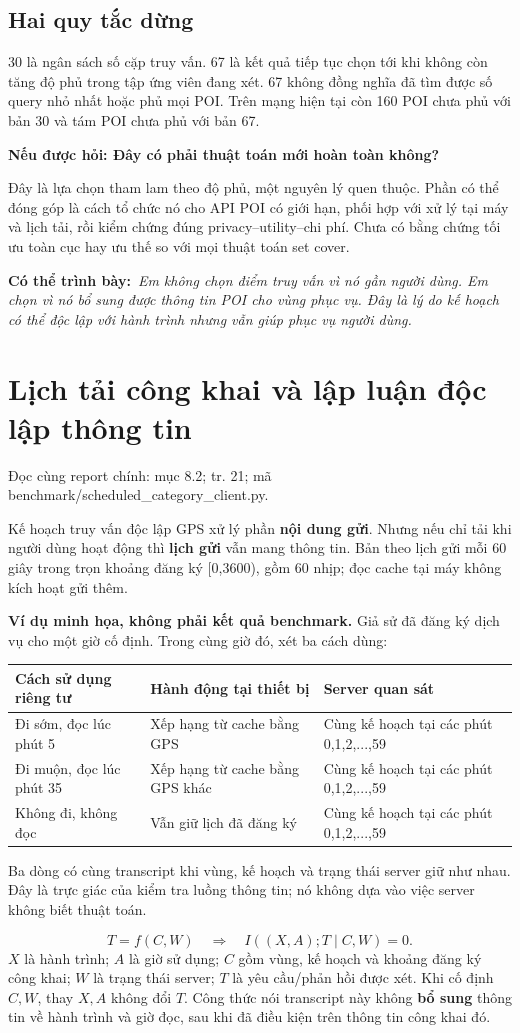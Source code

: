 \documentclass[10pt,a4paper]{article}
\newcommand{\say}[1]{\par\textbf{Có thể trình bày:}\ \textit{#1}\par}
\newcommand{\ask}[2]{\par\textbf{Nếu được hỏi: #1}\par #2\par}
\newcommand{\where}[1]{\par{\small\color{gray}Đọc cùng report chính: #1.}\par}
\newcommand{\example}{\textbf{Ví dụ minh họa, không phải kết quả benchmark.} }
\newcommand{\guidepage}[1]{\clearpage\section{#1}}
\begin{document}
\subsection*{Hai quy tắc dừng}
30 là ngân sách số cặp truy vấn. 67 là kết quả tiếp tục chọn tới khi không còn tăng độ phủ trong tập ứng viên đang xét. 67 không đồng nghĩa đã tìm được số query nhỏ nhất hoặc phủ mọi POI. Trên mạng hiện tại còn 160 POI chưa phủ với bản 30 và tám POI chưa phủ với bản 67.

\ask{Đây có phải thuật toán mới hoàn toàn không?}{Đây là lựa chọn tham lam theo độ phủ, một nguyên lý quen thuộc. Phần có thể đóng góp là cách tổ chức nó cho API POI có giới hạn, phối hợp với xử lý tại máy và lịch tải, rồi kiểm chứng đúng privacy--utility--chi phí. Chưa có bằng chứng tối ưu toàn cục hay ưu thế so với mọi thuật toán set cover.}
\say{Em không chọn điểm truy vấn vì nó gần người dùng. Em chọn vì nó bổ sung được thông tin POI cho vùng phục vụ. Đây là lý do kế hoạch có thể độc lập với hành trình nhưng vẫn giúp phục vụ người dùng.}

\guidepage{Lịch tải công khai và lập luận độc lập thông tin}
\where{mục 8.2; tr. 21; mã benchmark/scheduled\_category\_client.py}
Kế hoạch truy vấn độc lập GPS xử lý phần \textbf{nội dung gửi}. Nhưng nếu chỉ tải khi người dùng hoạt động thì \textbf{lịch gửi} vẫn mang thông tin. Bản theo lịch gửi mỗi 60 giây trong trọn khoảng đăng ký [0,3600), gồm 60 nhịp; đọc cache tại máy không kích hoạt gửi thêm.

\example Giả sử đã đăng ký dịch vụ cho một giờ cố định. Trong cùng giờ đó, xét ba cách dùng:
\begin{longtable}{@{}P{4.1cm}P{5.2cm}P{6.9cm}@{}}
\toprule Cách sử dụng riêng tư & Hành động tại thiết bị & Server quan sát\\\midrule
Đi sớm, đọc lúc phút 5 & Xếp hạng từ cache bằng GPS & Cùng kế hoạch tại các phút 0,1,2,...,59\\[3pt]
Đi muộn, đọc lúc phút 35 & Xếp hạng từ cache bằng GPS khác & Cùng kế hoạch tại các phút 0,1,2,...,59\\[3pt]
Không đi, không đọc & Vẫn giữ lịch đã đăng ký & Cùng kế hoạch tại các phút 0,1,2,...,59\\
\bottomrule
\end{longtable}
Ba dòng có cùng transcript khi vùng, kế hoạch và trạng thái server giữ như nhau. Đây là trực giác của kiểm tra luồng thông tin; nó không dựa vào việc server không biết thuật toán.

\[
T=f(C,W)\quad\Longrightarrow\quad I((X,A);T\mid C,W)=0.
\]
$X$ là hành trình; $A$ là giờ sử dụng; $C$ gồm vùng, kế hoạch và khoảng đăng ký công khai; $W$ là trạng thái server; $T$ là yêu cầu/phản hồi được xét. Khi cố định $C,W$, thay $X,A$ không đổi $T$. Công thức nói transcript này không \textbf{bổ sung} thông tin về hành trình và giờ đọc, sau khi đã điều kiện trên thông tin công khai đó.
\end{document}

